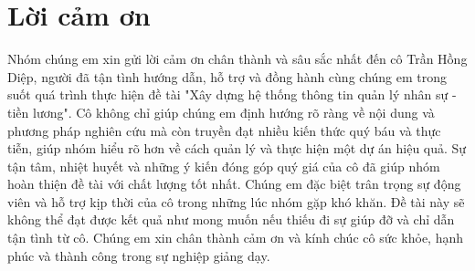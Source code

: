 \chapter*{Lời cảm ơn}
\label{thanks}
Nhóm chúng em xin gửi lời cảm ơn chân thành và sâu sắc nhất đến cô Trần Hồng Diệp, người đã tận tình hướng dẫn, hỗ trợ và đồng hành cùng chúng em trong suốt quá trình thực hiện đề tài "Xây dựng hệ thống thông tin quản lý nhân sự - tiền lương". Cô không chỉ giúp chúng em định hướng rõ ràng về nội dung và phương pháp nghiên cứu mà còn truyền đạt nhiều kiến thức quý báu và thực tiễn, giúp nhóm hiểu rõ hơn về cách quản lý và thực hiện một dự án hiệu quả.
Sự tận tâm, nhiệt huyết và những ý kiến đóng góp quý giá của cô đã giúp nhóm hoàn thiện đề tài với chất lượng tốt nhất. Chúng em đặc biệt trân trọng sự động viên và hỗ trợ kịp thời của cô trong những lúc nhóm gặp khó khăn. Đề tài này sẽ không thể đạt được kết quả như mong muốn nếu thiếu đi sự giúp đỡ và chỉ dẫn tận tình từ cô.
Chúng em xin chân thành cảm ơn và kính chúc cô sức khỏe, hạnh phúc và thành công trong sự nghiệp giảng dạy.
